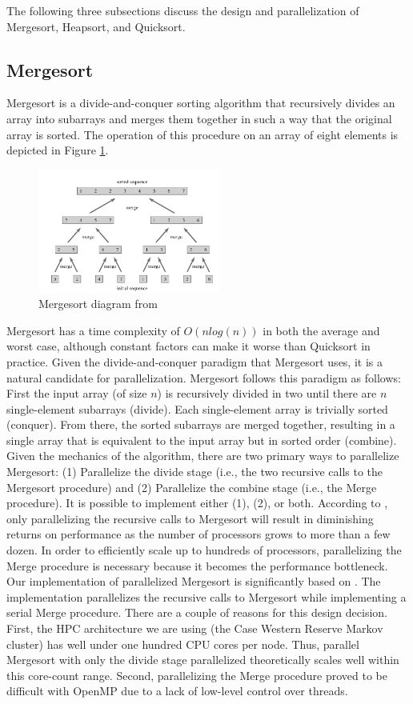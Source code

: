 \documentclass[conference]{IEEEtran}
\begin{document}
    The following three subsections discuss the design and parallelization of Mergesort, Heapsort, and Quicksort.
    
    \subsection{Mergesort}
    Mergesort is a divide-and-conquer sorting algorithm that recursively divides an array into subarrays and merges them together in such a way that the original array is sorted. 
    The operation of this procedure on an array of eight elements is depicted in Figure \ref{mrg}.  
    \begin{figure}[h]
        \includegraphics[width=6cm]{merge.png} 
        \caption{Mergesort diagram from \cite{cormen_introduction_2009}}
        \label{mrg}
    \end{figure}
    Mergesort has a time complexity of $O(nlog(n))$ in both the average and worst case, although constant factors can make it worse than Quicksort in practice. 
    Given the divide-and-conquer paradigm that Mergesort uses, it is a natural candidate for parallelization. Mergesort follows this paradigm as follows: First the input array (of size $n$) is recursively divided in two until there are $n$ single-element subarrays (divide). Each single-element array is trivially sorted (conquer). From there, the sorted subarrays are merged together, resulting in a single array that is equivalent to the input array but in sorted order (combine). Given the mechanics of the algorithm, there are two primary ways to parallelize Mergesort: (1) Parallelize the divide stage (i.e., the two recursive calls to the Mergesort procedure) and (2) Parallelize the combine stage (i.e., the Merge procedure). It is possible to implement either (1), (2), or both. According to \cite{cormen_introduction_2009}, only parallelizing the recursive calls to Mergesort will result in diminishing returns on performance as the number of processors grows to more than a few dozen. In order to efficiently scale up to hundreds of processors, parallelizing the Merge procedure is necessary because it becomes the performance bottleneck.
    Our implementation of parallelized Mergesort is significantly based on \cite{radenski_mergesort}. The implementation parallelizes the recursive calls to Mergesort while implementing a serial Merge procedure. There are a couple of reasons for this design decision. First, the HPC architecture we are using (the Case Western Reserve Markov cluster) has well under one hundred CPU cores per node. Thus, parallel Mergesort with only the divide stage parallelized theoretically scales well within this core-count range. Second, parallelizing the Merge procedure proved to be difficult with OpenMP due to a lack of low-level control over threads.
    
\end{document}

